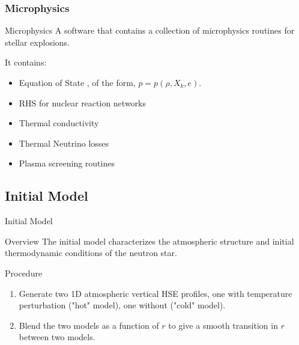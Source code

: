 \documentclass[
	11pt, %
]{beamer}
\begin{document}
\begin{frame}
    \frametitle{Microphysics}
    
    \begin{block}{Microphysics}
    A software that contains a collection of microphysics routines for stellar explosions.
    \end{block}
    
    \begin{block}{It contains:}
        \begin{itemize}
            \item Equation of State \cite{timmes_swesty:2000}, of the form, $p=p(\rho,X_k,e)$.
            \item RHS for nuclear reaction networks
            \item Thermal conductivity \cite{Timmes00}
            \item Thermal Neutrino losses\cite{neutrino}
            \item Plasma screening routines
        \end{itemize}
    \end{block}
\end{frame}




\subsection{Initial Model}

\begin{frame}{Initial Model}
    \begin{block}{Overview}
    The initial model characterizes the atmospheric structure and initial thermodynamic conditions of the neutron star.
    \end{block}

    
    \begin{block}{Procedure}
        \begin{enumerate}
            \item Generate two 1D atmospheric vertical HSE profiles, one with temperature perturbation ("hot" model), one without ("cold" model).
            \item Blend the two models as a function of $r$ to give a smooth transition in $r$ between two models.
        \end{enumerate}
    \end{block}
    
\end{frame}
\end{document}
